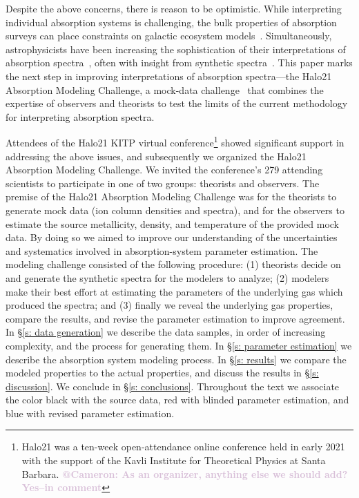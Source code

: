 \documentclass[fleqn,usenatbib]{mnras}
\makeatletter
\newcommand{\atcameron}[1]{\textcolor{Thistle}{\textbf{@Cameron: #1}}}
\makeatother
\begin{document}
Despite the above concerns, there is reason to be optimistic.
While interpreting individual absorption systems is challenging, the bulk properties of absorption surveys can place constraints on galactic ecosystem models~\citep[e.g.][]{Sorini2018, Lan2018}.
Simultaneously, astrophysicists have been increasing the sophistication of their interpretations of absorption spectra~\citep[e.g.][]{Churchill2015, Sameer2021}, often with insight from synthetic spectra~\citep[e.g.][]{Hummels2013, Liang2018}.
This paper marks the next step in improving interpretations of absorption spectra---the Halo21 Absorption Modeling Challenge, a mock-data challenge~\citep[e.g.][]{Regimbau2012, Meacher2015, Hazboun2019} that combines the expertise of observers and theorists to test the limits of the current methodology for interpreting absorption spectra.

Attendees of the Halo21 KITP virtual conference\footnote{Halo21 was a ten-week open-attendance online conference held in early 2021 with the support of the Kavli Institute for Theoretical Physics at Santa Barbara. \atcameron{As an organizer, anything else we should add? Yes--in comment}}
showed significant support in addressing the above issues, and subsequently we organized the Halo21 Absorption Modeling Challenge.
We invited the conference's 279 attending scientists to participate in one of two groups:
theorists and observers.
The premise of the Halo21 Absorption Modeling Challenge was for the theorists to generate mock data (ion column densities and spectra), and for the observers to estimate the source metallicity, density, and temperature of the provided mock data.
By doing so we aimed to improve our understanding of the uncertainties and systematics involved in absorption-system parameter estimation.
The modeling challenge consisted of the following procedure:
(1) theorists decide on and generate the synthetic spectra for the modelers to analyze; (2) modelers make their best effort at estimating the parameters of the underlying gas which produced the spectra; and (3) finally we reveal the underlying gas properties, compare the results, and revise the parameter estimation to improve agreement.
In \S\ref{s: data generation} we describe the data samples, in order of increasing complexity, and the process for generating them.
In \S\ref{s:  parameter estimation} we describe the absorption system modeling process.
In \S\ref{s: results} we compare the modeled properties to the actual properties, and discuss the results in \S\ref{s: discussion}.
We conclude in \S\ref{s: conclusions}.
Throughout the text we associate the color black with the source data,
red with blinded parameter estimation,
and blue with revised parameter estimation.
\end{document}
